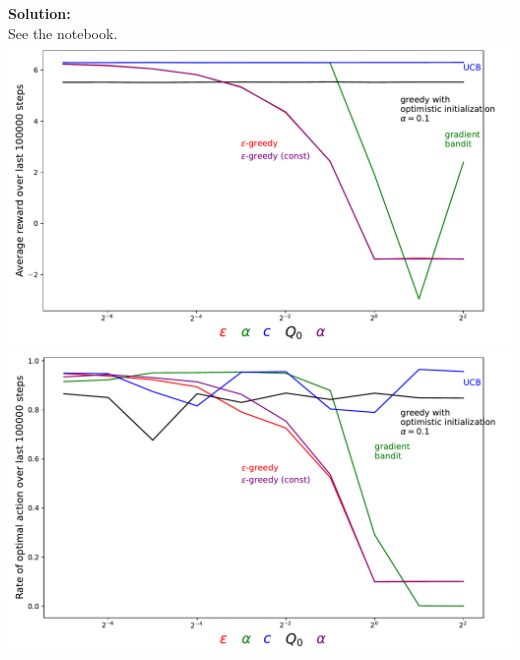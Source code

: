 \textbf{Solution:}\\
See the notebook. \\
\includegraphics[width=\textwidth, angle=0]{chapters_latex/figures/ex_02_11_reward.pdf}
\includegraphics[width=\textwidth, angle=0]{chapters_latex/figures/ex_02_11_rate.pdf}
